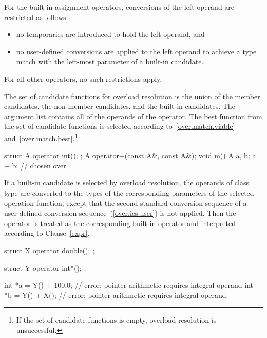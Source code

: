 \pnum
For the built-in assignment operators, conversions of the left
operand are restricted as follows:

\begin{itemize}
\item
no temporaries are introduced to hold the left operand, and
\item
no user-defined conversions are applied to the left operand to achieve
a type match with the left-most parameter of a built-in candidate.
\end{itemize}

\pnum
For all other operators, no such restrictions apply.

\pnum
The set of candidate functions for overload resolution is the
union of the member candidates, the non-member candidates, and
the built-in candidates.
The argument list contains all of the
operands of the operator.
The best function from the set of candidate functions is selected
according to~\ref{over.match.viable}
and~\ref{over.match.best}.\footnote{If the set of candidate functions is empty,
overload resolution is unsuccessful.}
\begin{example}

\begin{codeblock}
struct A {
  operator int();
};
A operator+(const A&, const A&);
void m() {
  A a, b;
  a + b;            //  chosen over 
}
\end{codeblock}
\end{example}

\pnum
If a built-in candidate is selected by overload resolution, the
operands of class type are converted to the types of the corresponding parameters
of the selected operation function, except that the second standard conversion
sequence of a user-defined conversion sequence~(\ref{over.ics.user}) is not applied.
Then the operator is treated as the corresponding
built-in operator and interpreted according to Clause~\ref{expr}.
\begin{example}
\begin{codeblock}
struct X {
  operator double();
};

struct Y {
  operator int*();
};

int *a = Y() + 100.0;      // error: pointer arithmetic requires integral operand
int *b = Y() + X();        // error: pointer arithmetic requires integral operand
\end{codeblock}
\end{example}

